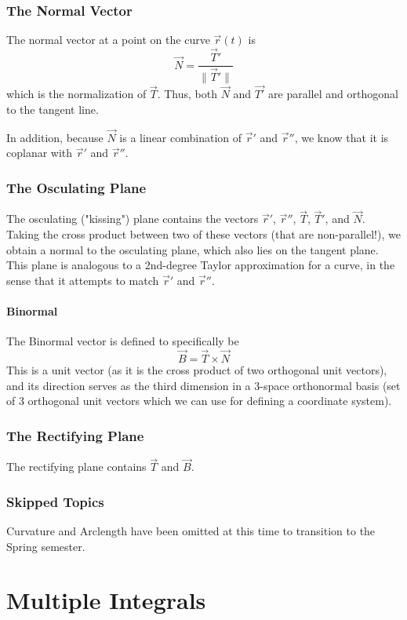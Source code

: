 \documentclass{article}
\newcommand{\vect}[1]{\ensuremath{\overrightarrow{#1}}}
\newcommand{\magnitude}[1]{\ensuremath{\lVert #1 \rVert}}
\begin{document}
\subsubsection{The Normal Vector}
The normal vector at a point on the curve $\vect{r}(t)$ is $$\vect{N}=\frac{\vect{T}'}{\magnitude{\vect{T}'}}$$ which is the normalization of $\vect{T}$.
Thus, both $\vect{N}$ and $\vect{T'}$ are parallel and orthogonal to the tangent line.

In addition, because $\vect{N}$ is a linear combination of $\vect{r}'$ and $\vect{r}''$, we know that it is coplanar with $\vect{r}'$ and $\vect{r}''$.

\subsubsection{The Osculating Plane}
The osculating ("kissing") plane contains the vectors $\vect{r}'$, $\vect{r}''$, $\vect{T}$, $\vect{T}'$, and $\vect{N}$. Taking the cross product between two of these vectors (that are non-parallel!), we obtain a normal to the osculating plane, which also lies on the tangent plane. This plane is analogous to a 2nd-degree Taylor approximation for a curve, in the sense that it attempts to match $\vect{r}'$ and $\vect{r}''$.

\paragraph{Binormal} The Binormal vector is defined to specifically be
$$\vect{B}=\vect{T}\times\vect{N}$$
This is a unit vector (as it is the cross product of two orthogonal unit vectors), and its direction serves as the third dimension in a 3-space orthonormal basis (set of 3 orthogonal unit vectors which we can use for defining a coordinate system).

\subsubsection{The Rectifying Plane}
The rectifying plane contains $\vect{T}$ and $\vect{B}$.

\subsubsection{Skipped Topics}
Curvature and Arclength have been omitted at this time to transition to the Spring semester.

\section{Multiple Integrals}
\end{document}

